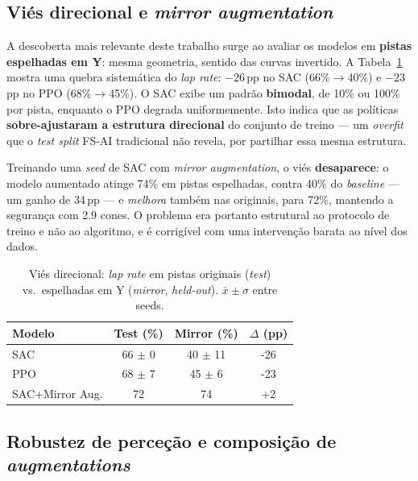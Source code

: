\documentclass[runningheads]{llncs}
\begin{document}
\subsection{Viés direcional e \textit{mirror augmentation}}
\label{sec:bias}

A descoberta mais relevante deste trabalho surge ao avaliar os modelos em \textbf{pistas espelhadas em Y}: mesma geometria, sentido das curvas invertido. A Tabela~\ref{tab:direction_bias} mostra uma quebra sistemática do \textit{lap rate}: $-26$\,pp no SAC (66\%$\rightarrow$40\%) e $-23$\,pp no PPO (68\%$\rightarrow$45\%). O SAC exibe um padrão \textbf{bimodal}, de 10\% ou 100\% por pista, enquanto o PPO degrada uniformemente. Isto indica que as políticas \textbf{sobre-ajustaram a estrutura direcional} do conjunto de treino --- um \textit{overfit} que o \textit{test split} FS-AI tradicional não revela, por partilhar essa mesma estrutura.

Treinando uma \textit{seed} de SAC com \textit{mirror augmentation}, o viés \textbf{desaparece}: o modelo aumentado atinge 74\% em pistas espelhadas, contra 40\% do \textit{baseline} --- um ganho de 34\,pp --- e \emph{melhora} também nas originais, para 72\%, mantendo a segurança com 2.9 cones. O problema era portanto estrutural ao protocolo de treino e não ao algoritmo, e é corrigível com uma intervenção barata ao nível dos dados.

\begin{table}[t]
\centering
\caption{Viés direcional: \textit{lap rate} em pistas originais (\textit{test}) vs.\ espelhadas em Y (\textit{mirror}, \textit{held-out}). $\bar{x}\pm\sigma$ entre seeds.}
\label{tab:direction_bias}
\begin{tabular}{lccc}
\toprule
\textbf{Modelo} & \textbf{Test (\%)} & \textbf{Mirror (\%)} & \textbf{$\Delta$ (pp)} \\
\midrule
SAC & 66 $\pm$ 0 & 40 $\pm$ 11 & -26 \\
PPO & 68 $\pm$ 7 & 45 $\pm$ 6 & -23 \\
SAC+Mirror Aug. & 72 & 74 & +2 \\
\bottomrule
\end{tabular}
\end{table}

\subsection{Robustez de perceção e composição de \textit{augmentations}}
\label{sec:robustez}
\end{document}
